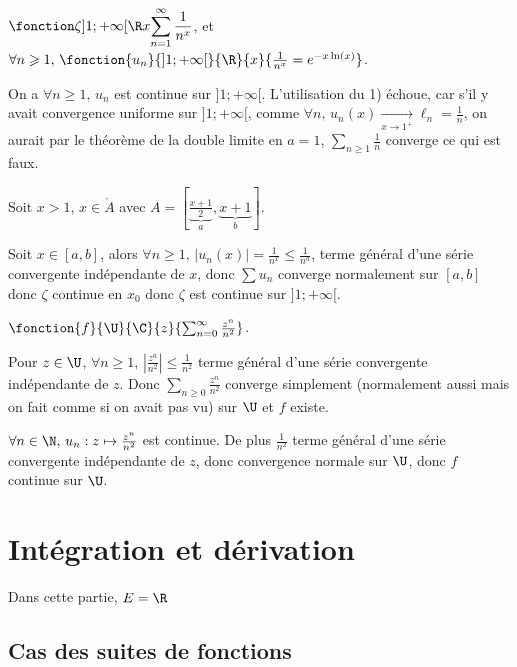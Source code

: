 \begin{exemple}
    $\displaystyle \fonction \zeta{]1; +\infty[}{\R}{x}{\sum_{n = 1}^{\infty} \frac 1 {n^x}}$, et 
    $\forall n \geqslant 1, \, \fonction{u_n}{]1; +\infty[}{\R}{x}{\frac 1 {n^x} = e^{-x \ln(x)}}$. 

    On a $\forall n \geqslant 1, \, u_n$ est continue sur $]1; +\infty[$. L'utilisation du 1) échoue, car 
    s'il y avait convergence uniforme sur $]1; +\infty[$, comme $\forall n, \, u_n(x) \xrightarrow[x \to 1^+]{} \ell_n = \frac 1 n$,
    on aurait par le théorème de la double limite en $a = 1$, $\sum_{n \geqslant 1 } \frac 1 n $ converge ce qui est faux. 

    \svspace Soit $x > 1$, $x \in \mathring A$ avec $A = \left[ \underbrace{\frac{x + 1}{2}}_{ a }, \underbrace{x + 1}_{ b} \right]$.

    Soit $x \in [a, b]$, alors $\forall n \geqslant 1, \, \left| u_n(x) \right| = \frac 1 {n^x} \leqslant \frac 1 {n^a}$, terme 
    général d'une série convergente indépendante de $x$, donc $\sum u_n$ converge normalement sur $[a, b]$ 
    donc $\zeta$ continue en $x_0$ donc $\zeta$ est continue sur $]1; +\infty[$.
\end{exemple}


\begin{exemple}
    $\fonction{f}{\U}{\C}{z}{\sum_{n = 0}^{\infty} \frac{z^n }{n^2}}$. 

    Pour $z \in \U$, $\forall n \geqslant 1, \, \left| \frac{z^n }{n^2} \right| \leqslant \frac 1 {n^2}$ terme général
    d'une série convergente indépendante de $z$. Donc $\sum_{n \geqslant 0} \frac{z^n }{n^2}$ converge simplement (normalement aussi mais on fait comme si 
    on avait pas vu) sur $\U$ et $f$ existe. 

    $\forall n \in \N, \, u_n : z \mapsto \frac{z^n }{n^2}$ est continue. De plus 
    $\frac 1 {n^2}$ terme général d'une série convergente indépendante de $z$, donc convergence 
    normale sur $\U$, donc $f$ continue sur $\U$.
\end{exemple}

\section{Intégration et dérivation}
Dans cette partie, $E = \R$
\subsection{Cas des suites de fonctions}

